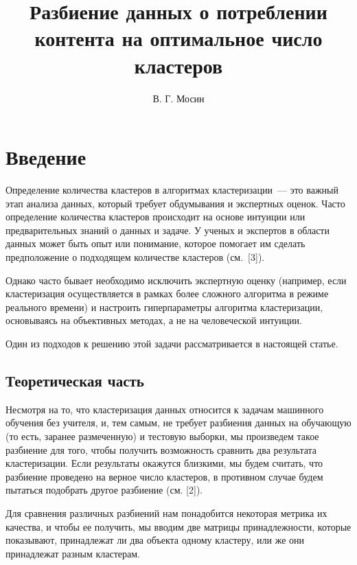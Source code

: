 \documentclass[a4paper,12pt]{article}
\title{Разбиение данных о потреблении контента на оптимальное число кластеров}
\author{В. Г. Мосин}
\date{}
\begin{document}
	\maketitle
	
\tableofcontents
	
\section{Введение}
Определение количества кластеров в алгоритмах кластеризации — это важный этап анализа данных, который требует обдумывания и экспертных оценок. Часто определение количества кластеров происходит на основе интуиции или предварительных знаний о данных и задаче. У ученых и экспертов в области данных может быть опыт или понимание, которое помогает им сделать предположение о подходящем количестве кластеров (см. [3]).

Однако часто бывает необходимо исключить экспертную оценку (например, если кластеризация осуществляется в рамках более сложного алгоритма в режиме реального времени) и настроить гиперпараметры алгоритма кластеризации, основываясь на объективных методах, а не на человеческой интуиции.

Один из подходов к решению этой задачи рассматривается в настоящей статье.


\subsection{Теоретическая часть}

Несмотря на то, что кластеризация данных относится к задачам машинного обучения без учителя, и, тем самым, не требует разбиения данных на обучающую (то есть, заранее размеченную) и тестовую выборки, мы произведем такое разбиение для того, чтобы получить возможность сравнить два результата кластеризации. Если результаты окажутся близкими, мы будем считать, что разбиение проведено на верное число кластеров, в противном случае будем пытаться подобрать другое разбиение (см. [2]).

Для сравнения различных разбиений нам понадобится некоторая метрика их качества, и чтобы ее получить, мы вводим две матрицы принадлежности, которые показывают, принадлежат ли два объекта одному кластеру, или же они принадлежат разным кластерам.
\end{document}
